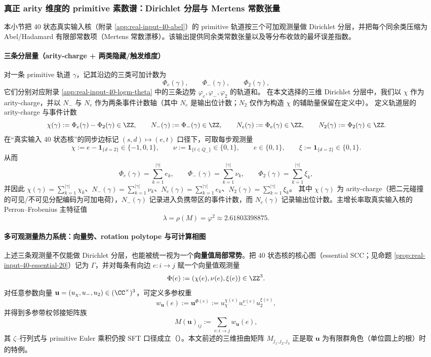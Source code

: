 \subsubsection{真正 arity 维度的 primitive 素数谱：Dirichlet 分层与 Mertens 常数张量}\label{subsec:arity-dirichlet-mertens-tensor}
本小节把 40 状态真实输入核（附录 \ref{app:real-input-40-abel}）的 primitive 轨道按三个可加观测量做 Dirichlet 分层，并把每个同余类压缩为 Abel/Hadamard 有限部常数项（Mertens 常数漂移）。该输出提供同余类常数张量以及等分布收敛的最坏误差指数。

\paragraph{三条分层量（arity-charge + 两类隐藏/触发维度）}
对一条 primitive 轨道 $\gamma$，记其沿边的三类可加计数为
$$
\Phi_e(\gamma),\qquad \Phi_-(\gamma),\qquad \Phi_2(\gamma),
$$
它们分别对应附录 \ref{app:real-input-40-logm-theta} 中的三条边势 $\varphi_e,\varphi_-,\varphi_2$ 的轨道和。
在本文选择的三维 Dirichlet 分层中，我们以 $\chi$ 作为 arity-charge，并以 $N_-$ 与 $N_e$ 作为两条事件计数轴（其中 $N_e$ 是输出位计数；$N_2$ 仅作为构造 $\chi$ 的辅助量保留在定义中）。
定义轨道层的 arity-charge 与事件计数
$$
\chi(\gamma):=\Phi_e(\gamma)-\Phi_2(\gamma)\in\ZZ,
\qquad
N_-(\gamma):=\Phi_-(\gamma)\in\ZZ,
\qquad
N_e(\gamma):=\Phi_e(\gamma)\in\ZZ,
\qquad
N_2(\gamma):=\Phi_2(\gamma)\in\ZZ.
$$
在“真实输入 40 状态核”的同步边标记 $(s,d)\mapsto(e,t)$ 口径下，可取每步观测量
$$
\chi:=e-\mathbf{1}_{\{d=2\}}\in\{-1,0,1\},
\qquad
\nu:=\mathbf{1}_{\{t\in Q_-\}}\in\{0,1\},
\qquad
e\in\{0,1\},
\qquad
\xi:=\mathbf{1}_{\{d=2\}}\in\{0,1\}.
$$
从而
$$
\Phi_e(\gamma)=\sum_{k=1}^{|\gamma|} e_k,
\qquad
\Phi_-(\gamma)=\sum_{k=1}^{|\gamma|} \nu_k,
\qquad
\Phi_2(\gamma)=\sum_{k=1}^{|\gamma|} \xi_k,
$$
并因此 $\chi(\gamma)=\sum_{k=1}^{|\gamma|}\chi_k$、$N_-(\gamma)=\sum_{k=1}^{|\gamma|}\nu_k$、$N_e(\gamma)=\sum_{k=1}^{|\gamma|}e_k$、$N_2(\gamma)=\sum_{k=1}^{|\gamma|}\xi_k$。
其中 $\chi(\gamma)$ 为 arity-charge（把二元碰撞的可见/不可见分配编码为可加电荷），$N_-(\gamma)$ 记录进入负携带区的事件计数，而 $N_e(\gamma)$ 记录输出位计数。主增长率取真实输入核的 Perron--Frobenius 主特征值
$$
\lambda=\rho(M)=\varphi^2\approx 2.61803398875.
$$

\paragraph{多可观测量热力系统：向量势、rotation polytope 与可计算相图}
上述三条观测量不仅能做 Dirichlet 分层，也能被统一视为一个\textbf{向量值局部常势}。把 40 状态核的核心图（essential SCC；见命题 \ref{prop:real-input-40-essential-20}）记为 $\Gamma$，并对每条有向边 $e:i\to j$ 赋一个向量值观测量
$$
\Phi(e):=(\chi(e),\nu(e),\xi(e))\in\ZZ^3.
$$
对任意参数向量 $\mathbf{u}=(u_\chi,u_-,u_2)\in(\CC^\times)^3$，可定义多参权重
$$
w_{\mathbf{u}}(e):=\mathbf{u}^{\Phi(e)}:=u_\chi^{\chi(e)}u_-^{\nu(e)}u_2^{\xi(e)},
$$
并得到多参带权邻接矩阵族
$$
M(\mathbf{u})_{ij}:=\sum_{e:i\to j} w_{\mathbf{u}}(e),
$$
其 $\zeta$--行列式与 primitive Euler 乘积仍按 SFT 口径成立（\cite{BrinStuck2002,ParryPollicott1990Zeta}）。本文前述的三维扭曲矩阵 $M_{j_1,j_2,j_3}$ 正是取 $\mathbf{u}$ 为有限群角色（单位圆上的根）时的特例。

